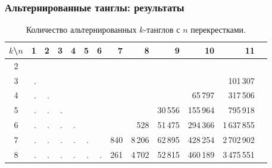 \documentclass[dvips, intlimits, 9pt, unicode, notheorems, color=usenames,dvipsnames]{beamer}
\theoremstyle{plain}
\theoremstyle{definition}
\begin{document}
	\begin{frame}
		\frametitle{Альтернированные танглы: результаты}

		\begin{table}[ht]
		{
			\tiny
			\caption{Количество альтернированных $k$-танглов с $n$ перекрестками.\label{table:alternating-tangles-table}}
			\centering
			\begin{tabular}{|c||r|r|r|r|r|r|r|r|r|r|r|r|}
			\hline
			$k$\textbackslash $n$
			    &               1 &               2 &               3 &               4 &                5 &                 6 &                    7 &                    8 &                     9 &                    10 &                     11 \\
			\hline\hline
			2   & \color{Gray}{1} & \color{Gray}{1} & \color{Gray}{2} & \color{Gray}{5} & \color{Gray}{13} & \color{Gray}{ 36} &    \color{Gray}{111} &    \color{Gray}{373} &  \color{Gray}{1\,362} &  \color{Gray}{5\,378} &  \color{Gray}{22\,807} \\
			3   &               . & \color{Gray}{1} & \color{Gray}{2} & \color{Gray}{7} & \color{Gray}{20} & \color{Gray}{ 77} &    \color{Gray}{276} & \color{Gray}{1\,135} &  \color{Gray}{4\,823} & \color{Gray}{21\,734} &               101\,307 \\
			4   &               . &               . & \color{Gray}{2} & \color{Gray}{8} & \color{Gray}{37} & \color{Gray}{157} &    \color{Gray}{687} & \color{Gray}{3\,052} & \color{Gray}{13\,981} &               65\,797 &               317\,506 \\
			5   &               . &               . &               . & \color{Gray}{5} & \color{Gray}{31} & \color{Gray}{209} & \color{Gray}{1\,128} & \color{Gray}{5\,986} &               30\,556 &              155\,964 &               795\,918 \\
			6   &               . &               . &               . &               . & \color{Gray}{16} & \color{Gray}{161} & \color{Gray}{1\,294} &                \,528 &               51\,475 &              294\,366 &            1\,637\,855 \\
			7   &               . &               . &               . &               . &                . & \color{Gray}{ 60} &                  840 &               8\,206 &               62\,895 &              428\,254 &            2\,702\,902 \\
			8   &               . &               . &               . &               . &                . &                 . &                  261 &               4\,702 &               52\,815 &              460\,189 &            3\,475\,551 \\

\end{tabular}}
\end{table}
\end{frame}
\end{document}
